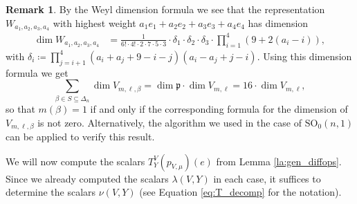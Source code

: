 \documentclass[JEP,XML,SOM,NoFloatCountersInSection,Unicode,published]{cedram}
\theoremstyle{definition}
\newtheorem{remark}[theorem]{Remark}
\newcommand{\mf}[1]{\ensuremath{\mathfrak{#1}}}
\newcommand{\GSO}[1]{\ensuremath{\mathrm{SO}_0(#1,1)}}
\begin{document}
\begin{remark}\label{rem:dim_F}
By the Weyl dimension formula we see that the representation $W_{a_1,a_2,a_3,a_4}$ with highest weight $a_1e_1+a_2e_2+a_3e_3+a_4e_4$ has dimension
\begin{align*}
\dim W_{a_1,a_2,a_3,a_4}&=\frac{1}{6!\cdot4!\cdot2\cdot7\cdot5\cdot3}\cdot\delta_1\cdot\delta_2\cdot\delta_3\cdot\prod_{i=1}^4(9+2(a_i-i)),
\end{align*}
with $\delta_i\coloneqq\prod_{j=i+1}^4(a_i+a_j+9-i-j)(a_i-a_j+j-i)$. Using this dimension formula we get
\[
\sum_{\beta\in S\subseteq\Delta_n}\dim V_{m,\ell,\beta}=\dim\mf p\cdot\dim V_{m,\ell}=16\cdot\dim V_{m,\ell},
\]
so that $m(\beta)=1$ if and only if the corresponding formula for the dimension of $V_{m,\ell,\beta}$ is not zero. Alternatively, the algorithm we used in the case of $\GSO{n}$ can be applied to verify this result.
\end{remark}

We will now compute the scalars $T_Y^V(p_{V,\mu})(e)$ from Lemma \ref{la:gen_diffops}. Since we already computed the scalars $\lambda(V,Y)$ in each case, it suffices to determine the scalars $\nu(V,Y)$ (see Equation \eqref{eq:T_decomp} for the notation).
\end{document}
